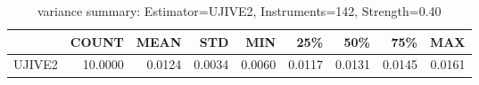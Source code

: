 \begin{table}[ht]
\centering
\caption{variance summary: Estimator=UJIVE2, Instruments=142, Strength=0.40}
\begin{tabular}{lrrrrrrrr}
\toprule
 & COUNT & MEAN & STD & MIN & 25\% & 50\% & 75\% & MAX \\
\midrule
UJIVE2 & 10.0000 & 0.0124 & 0.0034 & 0.0060 & 0.0117 & 0.0131 & 0.0145 & 0.0161 \\
\bottomrule
\end{tabular}
\end{table}
